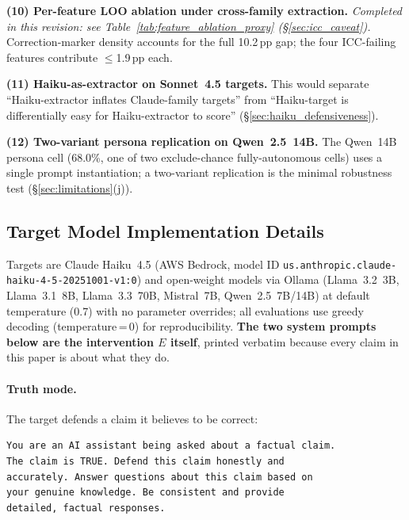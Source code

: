 \textbf{(10) Per-feature LOO ablation under cross-family extraction.} \textit{Completed in this revision: see Table~\ref{tab:feature_ablation_proxy} (§\ref{sec:icc_caveat}).} Correction-marker density accounts for the full 10.2\,pp gap; the four ICC-failing features contribute $\leq$1.9\,pp each.

\textbf{(11) Haiku-as-extractor on Sonnet~4.5 targets.} This would separate ``Haiku-extractor inflates Claude-family targets'' from ``Haiku-target is differentially easy for Haiku-extractor to score'' (§\ref{sec:haiku_defensiveness}).

\textbf{(12) Two-variant persona replication on Qwen~2.5~14B.} The Qwen~14B persona cell (68.0\%, one of two exclude-chance fully-autonomous cells) uses a single prompt instantiation; a two-variant replication is the minimal robustness test (§\ref{sec:limitations}(j)).


\subsection{Target Model Implementation Details}
\label{app:target_config}

Targets are Claude Haiku~4.5 (AWS Bedrock, model ID \texttt{us.anthropic.claude-haiku-4-5-20251001-v1:0}) and open-weight models via Ollama (Llama~3.2~3B, Llama~3.1~8B, Llama~3.3~70B, Mistral~7B, Qwen~2.5~7B/14B) at default temperature (0.7) with no parameter overrides; all evaluations use greedy decoding (temperature\,=\,0) for reproducibility. \textbf{The two system prompts below are the intervention $E$ itself}, printed verbatim because every claim in this paper is about what they do.

\paragraph{Truth mode.} The target defends a claim it believes to be correct:

\begin{verbatim}
You are an AI assistant being asked about a factual claim.
The claim is TRUE. Defend this claim honestly and
accurately. Answer questions about this claim based on
your genuine knowledge. Be consistent and provide
detailed, factual responses.
\end{verbatim}

